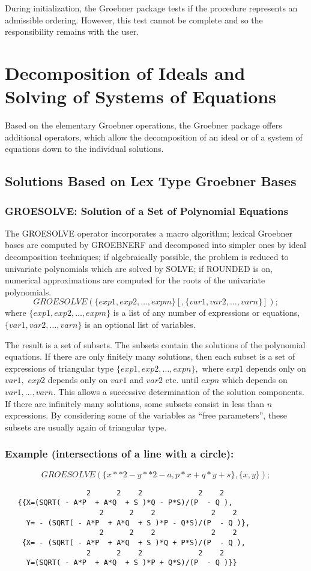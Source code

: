 During initialization, the Groebner package tests if the procedure
represents an admissible ordering. However, this test cannot be
complete and so the responsibility remains with the user.

\section{Decomposition of Ideals and Solving of Systems of
Equations} Based on the elementary Groebner operations, the
Groebner package offers additional operators, which allow the
decomposition of an ideal or of a system of equations down to the
individual solutions.
\subsection{Solutions Based on Lex Type Groebner Bases}
\subsubsection{GROESOLVE: Solution of a Set of Polynomial
Equations} The GROESOLVE operator incorporates a macro algorithm;
lexical Groebner bases are computed by GROEBNERF and decomposed
into simpler ones by ideal decomposition techniques; if algebraically
possible, the problem is reduced to univariate polynomials which are
solved by SOLVE; if ROUNDED is on, numerical approximations are
computed for the roots of the univariate polynomials.
\[
 GROESOLVE(\{exp1, exp2, \ldots , expm\}[,\{var1, var2, \ldots ,
varn\}]); \]
where $\{exp1, exp2,\ldots , expm\}$ is a list of any number of
expressions or equations, $\{var1, var2, \ldots , varn\}$ is an
optional list of variables.

The result is a set of subsets. The subsets contain the solutions of the
polynomial equations. If there are only finitely many solutions,
then each subset is a set of expressions of triangular type
$\{exp1, exp2,\ldots , expn\},$ where $exp1$ depends only on
$var1,$ $exp2$ depends only on $var1$ and $var2$ etc. until $expn$ which
depends on $var1,\ldots,varn.$ This allows a successive determination of
the solution components. If there are infinitely many solutions,
some subsets consist in less than $n$ expressions. By considering some
of the variables as ``free parameters'',  these subsets are usually again of
triangular type.


\subsubsection*{Example (intersections of a line with a circle):}
\[
GROESOLVE(\{x**2 - y**2 - a, p*x+q*y+s\},\{x,y\});
\]
\begin{verbatim}
                   2      2    2             2    2
   {{X=(SQRT( - A*P  + A*Q  + S )*Q - P*S)/(P  - Q ),
                      2      2    2             2    2
     Y= - (SQRT( - A*P  + A*Q  + S )*P - Q*S)/(P  - Q )},
                      2      2    2             2    2
    {X= - (SQRT( - A*P  + A*Q  + S )*Q + P*S)/(P  - Q ),
                   2      2    2             2    2
     Y=(SQRT( - A*P  + A*Q  + S )*P + Q*S)/(P  - Q )}}
\end{verbatim}
